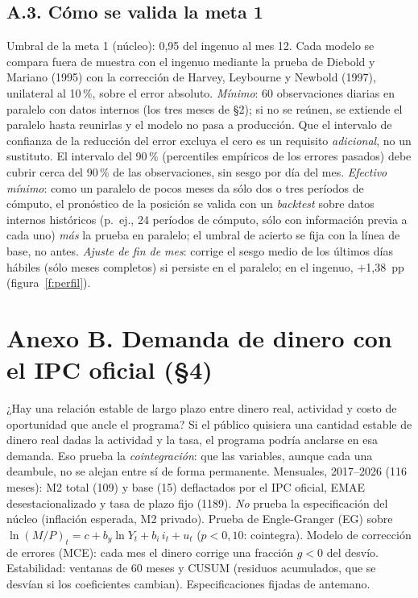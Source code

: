 \subsection*{A.3. Cómo se valida la meta 1}
Umbral de la meta 1 (núcleo): 0,95 del ingenuo al mes 12. Cada modelo se compara fuera de muestra con el ingenuo mediante la prueba de Diebold y Mariano (1995) con la corrección de Harvey, Leybourne y Newbold (1997), unilateral al 10\,\%, sobre el error absoluto. \emph{Mínimo}: 60 observaciones diarias en paralelo con datos internos (los tres meses de §2); si no se reúnen, se extiende el paralelo hasta reunirlas y el modelo no pasa a producción. Que el intervalo de confianza de la reducción del error excluya el cero es un requisito \emph{adicional}, no un sustituto. El intervalo del 90\,\% (percentiles empíricos de los errores pasados) debe cubrir cerca del 90\,\% de las observaciones, sin sesgo por día del mes.
\emph{Efectivo mínimo}: como un paralelo de pocos meses da sólo dos o tres períodos de cómputo, el pronóstico de la posición se valida con un \emph{backtest} sobre datos internos históricos (p.~ej., 24 períodos de cómputo, sólo con información previa a cada uno) \emph{más} la prueba en paralelo; el umbral de acierto se fija con la línea de base, no antes.
\emph{Ajuste de fin de mes}: corrige el sesgo medio de los últimos días hábiles (sólo meses completos) si persiste en el paralelo; en el ingenuo, $+$1,38~pp (figura~\ref{f:perfil}).

\section*{Anexo B. Demanda de dinero con el IPC oficial (§4)}
 ¿Hay una relación estable de largo plazo entre dinero real, actividad y costo de oportunidad que ancle el programa?
 Si el público quisiera una cantidad estable de dinero real dadas la actividad y la tasa, el programa podría anclarse en esa demanda. Eso prueba la \emph{cointegración}: que las variables, aunque cada una deambule, no se alejan entre sí de forma permanente.  Mensuales, 2017--2026 (116 meses): M2 total (109) y base (15) deflactados por el IPC oficial, EMAE desestacionalizado y tasa de plazo fijo (1189). \emph{No} prueba la especificación del núcleo (inflación esperada, M2 privado).
 Prueba de Engle-Granger (EG) sobre $\ln(M/P)_t = c + b_y \ln Y_t + b_i\, i_t + u_t$ ($p<0{,}10$: cointegra). Modelo de corrección de errores (MCE): cada mes el dinero corrige una fracción $g<0$ del desvío. Estabilidad: ventanas de 60 meses y CUSUM (residuos acumulados, que se desvían si los coeficientes cambian). Especificaciones fijadas de antemano.

